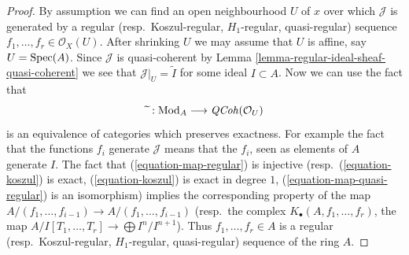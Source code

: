 \begin{proof}
By assumption we can find an open neighbourhood $U$ of $x$ over which
$\mathcal{J}$ is generated by a
regular (resp.\ Koszul-regular, $H_1$-regular, quasi-regular)
sequence $f_1, \ldots, f_r \in \mathcal{O}_X(U)$. After shrinking
$U$ we may assume that $U$ is affine, say $U = \mathop{\mathrm{Spec}}(A)$.
Since $\mathcal{J}$ is quasi-coherent by
Lemma \ref{lemma-regular-ideal-sheaf-quasi-coherent}
we see that $\mathcal{J}|_U = \widetilde{I}$ for some ideal $I \subset A$.
Now we can use the fact that
$$
\widetilde{\ } : \text{Mod}_A \longrightarrow \mathit{QCoh}(\mathcal{O}_U)
$$
is an equivalence of categories which preserves exactness. For example
the fact that the functions $f_i$ generate $\mathcal{J}$ means that
the $f_i$, seen as elements of $A$ generate $I$. The fact that
(\ref{equation-map-regular}) is injective
(resp.\ (\ref{equation-koszul}) is exact, (\ref{equation-koszul}) is exact
in degree $1$, (\ref{equation-map-quasi-regular}) is an isomorphism)
implies the corresponding property of the map
$A/(f_1, \ldots, f_{i - 1}) \to A/(f_1, \ldots, f_{i - 1})$
(resp.\ the complex $K_\bullet(A, f_1, \ldots, f_r)$, the
map $A/I[T_1, \ldots, T_r] \to \bigoplus I^n/I^{n + 1}$).
Thus $f_1, \ldots, f_r \in A$ is a regular
(resp.\ Koszul-regular, $H_1$-regular, quasi-regular)
sequence of the ring $A$.
\end{proof}

